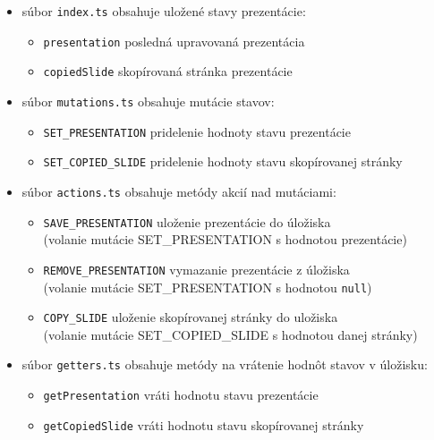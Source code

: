     \begin{itemize}
        \item súbor \texttt{index.ts} obsahuje uložené stavy prezentácie:
        \begin{itemize}
            \item \texttt{presentation} posledná upravovaná prezentácia
            \item \texttt{copiedSlide} skopírovaná stránka prezentácie
        \end{itemize}
        
        \item súbor \texttt{mutations.ts} obsahuje mutácie stavov:
        \begin{itemize}
            \item \texttt{SET\_PRESENTATION} pridelenie hodnoty stavu prezentácie
            \item \texttt{SET\_COPIED\_SLIDE} pridelenie hodnoty stavu skopírovanej stránky
        \end{itemize}
        
        \item súbor \texttt{actions.ts} obsahuje metódy akcií nad mutáciami:
        \begin{itemize}
            \item \texttt{SAVE\_PRESENTATION} uloženie prezentácie do úložiska\\(volanie mutácie SET\_PRESENTATION s hodnotou prezentácie)
            \item \texttt{REMOVE\_PRESENTATION} vymazanie prezentácie z úložiska\\(volanie mutácie SET\_PRESENTATION s hodnotou \texttt{null})
            \item \texttt{COPY\_SLIDE} uloženie skopírovanej stránky do uložiska\\(volanie mutácie SET\_COPIED\_SLIDE s hodnotou danej stránky)
        \end{itemize}
        
        \item súbor \texttt{getters.ts} obsahuje metódy na vrátenie hodnôt stavov v úložisku:
        \begin{itemize}
            \item \texttt{getPresentation} vráti hodnotu stavu prezentácie
            \item \texttt{getCopiedSlide} vráti hodnotu stavu skopírovanej stránky
        \end{itemize}
    \end{itemize}
    
